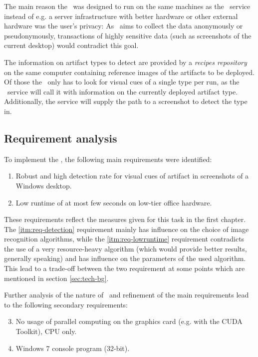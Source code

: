 The main reason the \vd~was designed to run on the same machines as the \ape~service instead of e.g. a server infrastructure with better hardware or other external hardware was the user's privacy:  As \ape~aims to collect the data anonymously or pseudonymously, transactions of highly sensitive data (such as screenshots of the current desktop) would contradict this goal.

The information on artifact types to detect are provided by a \emph{recipes repository} on the same computer containing reference images of the artifacts to be deployed. Of those the \vd~only has to look for visual cues of a single type per run, as the \ape~service will call it with information on the currently deployed artifact type. Additionally, the service will supply the path to a screenshot to detect the type in.

\subsection{Requirement analysis}

To implement the \vd, the following main requirements were identified:

\begin{enumerate}
	\item \label{itm:req-detection} Robust and high detection rate for visual cues of artifact in screenshots of a Windows desktop.
	\item \label{itm:req-lowruntime} Low runtime of at most few seconds on low-tier office hardware.
\end{enumerate}

These requirements reflect the measures given for this task in the first chapter. The \ref{itm:req-detection} requirement mainly has influence on the choice of image recognition algorithms, while the \ref{itm:req-lowruntime} requirement contradicts the use of a very resource-heavy algorithm (which would provide better results, generally speaking) and has influence on the parameters of the used algorithm. This lead to a trade-off between the two requirement at some points which are mentioned in section \ref{sec:tech-bg}.

Further analysis of the nature of \ape~and refinement of the main requirements lead to the following secondary requirements:

\begin{enumerate}\setcounter{enumi}{2}
	\item \label{itm:req-nocuda} No usage of parallel computing on the graphics card (e.g. with the CUDA Toolkit\cite{cuda}), CPU only.
	\item \label{itm:req-win7console} Windows 7 console program (32-bit).
\end{enumerate}

